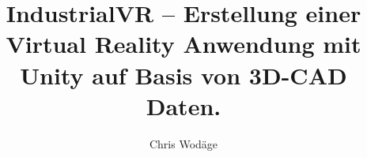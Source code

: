 

\newcommand{\sieheKapitel}[1]{\glqq {#1}\grqq}
\newcommand{\sieheAbbVerweis}[2]{(siehe Abb. {#1} -- {#2})}
\newcommand{\sieheAbb}[1]{(siehe Abb. {#1})}
\usepackage{chngcntr}
\usepackage[format=plain, justification=RaggedRight, singlelinecheck=false]{caption}

\logoPathL{} %
\gradeType{}
\secondExaminer{}

%

\title{IndustrialVR -- Erstellung einer Virtual Reality Anwendung mit Unity auf Basis von 3D-CAD Daten.}
\author{Chris Wodäge}

\makeindex[title=Stichwortverzeichnis, options=-s indexstyle.ist, intoc]

\makeglossaries
{}



\maketitle



\null\thispagestyle{empty}

 

\listoffigures \clearpage

\tableofcontents \newpage
{}


 \clearpage
 \clearpage



